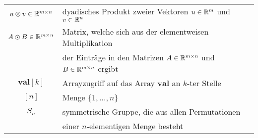 \begin{tabular}{cp{}}
    $u \otimes v \in \mathbb{R}^{m \times n}$ & dyadisches Produkt zweier Vektoren $u \in \mathbb{R}^m$ und $v \in \mathbb{R}^n$ \\
    $A \odot B \in \mathbb{R}^{m \times n}$ & Matrix, welche sich aus der elementweisen Multiplikation \\ & der Einträge in den Matrizen $A \in \mathbb{R}^{m \times n}$ und $B \in \mathbb{R}^{m \times n}$ ergibt \\
    $\mathbf{val}[k]$ & Arrayzugriff auf das Array $\mathbf{val}$ an $k$-ter Stelle \\
    $[n]$ & Menge $\{1, \ldots, n\}$ \\
    $S_n$ & symmetrische Gruppe, die aus allen Permutationen \\ &einer $n$-elementigen Menge besteht 
\end{tabular}